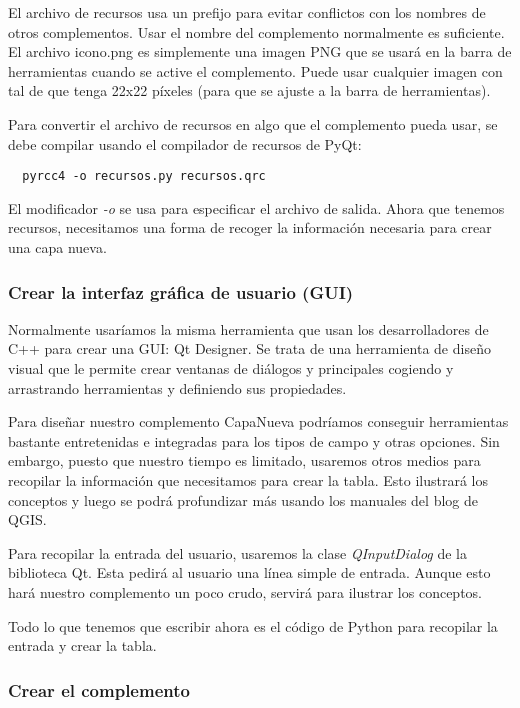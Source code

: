 El archivo de recursos usa un prefijo para evitar conflictos con los nombres de otros complementos. 
Usar el nombre del complemento normalmente es suficiente. El archivo {icono.png} es simplemente una 
imagen PNG que se usará en la barra de herramientas cuando se active el complemento. Puede 
usar cualquier imagen con tal de que tenga 22x22 píxeles (para que se ajuste a la barra de herramientas).

Para convertir el archivo de recursos en algo que el complemento pueda usar, se debe compilar usando el compilador de recursos de PyQt:

\begin{verbatim}
  pyrcc4 -o recursos.py recursos.qrc
\end{verbatim}

El modificador \textsl{-o} se usa para especificar el archivo de salida. Ahora que tenemos recursos, 
necesitamos una forma de recoger la información necesaria para crear una capa nueva.

\subsubsection{Crear la interfaz gráfica de usuario (GUI)}

Normalmente usaríamos la misma herramienta que usan los desarrolladores de C++ para crear una GUI: Qt Designer. 
Se trata de una herramienta de diseño visual que le permite crear ventanas de diálogos y principales 
cogiendo y arrastrando herramientas y definiendo sus propiedades.

Para diseñar nuestro complemento CapaNueva podríamos conseguir herramientas bastante entretenidas e integradas 
para los tipos de campo y otras opciones. Sin embargo, puesto que nuestro tiempo es limitado, usaremos 
otros medios para recopilar la información que necesitamos para crear la tabla.
Esto ilustrará los 
conceptos y luego se podrá profundizar más usando los manuales del blog de QGIS.

Para recopilar la entrada del usuario, usaremos la clase \textsl{QInputDialog} de la biblioteca Qt. 
Esta pedirá al usuario una línea simple de entrada. Aunque esto hará nuestro complemento un poco 
crudo, servirá para ilustrar los conceptos.

Todo lo que tenemos que escribir ahora es el código de Python para recopilar la entrada y crear la tabla.

\subsubsection{Crear el complemento}

